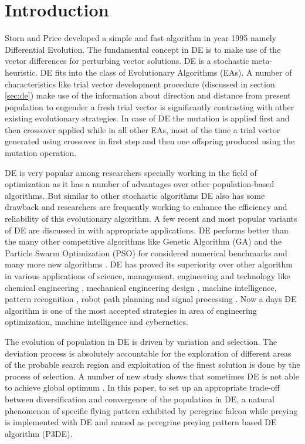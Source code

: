 \documentclass{svproc}
\begin{document}
\section{Introduction}\label{sec:intro}
Storn and Price \cite{price1996differential} developed a simple and fast algorithm in year 1995 namely Differential Evolution. The fundamental concept in DE is to make use of the vector differences for perturbing vector solutions. DE is a stochastic meta-heuristic. DE fits into the class of Evolutionary Algorithms (EAs). A number of characteristics like trial vector development procedure (discussed in section \ref{sec:de}) make use of the information about direction and distance from present population to engender a fresh trial vector is significantly contrasting with other existing evolutionary strategies. In case of DE the mutation is applied first and then  crossover applied while in all other EAs, most of the time a trial vector generated using crossover in first step and then one offspring produced using the mutation operation.

DE is very popular among researchers specially working in the field of optimization as it has a number of advantages over other population-based algorithms. But similar to other stochastic algorithms DE also has some drawback and researchers are frequently working to enhance the efficiency and reliability of this evolutionary algorithm. A few recent and most popular variants of DE are discussed  in \cite{chakraborty2008advances} with appropriate applications. DE performs better than the many other 	competitive algorithms like Genetic Algorithm (GA) \cite{holland1975adaptation, kumar2018genetic} and the Particle Swarm Optimization (PSO) \cite{kennedy1995particle} for considered numerical benchmarks \cite{vesterstrom2004comparative} and many more new algorithms \cite{rajpurohit2017glossary}. DE has proved its superiority over other algorithm in various applications of science, management, engineering and technology like chemical engineering \cite{liu2008inverse}, mechanical engineering design \cite{rogalsky2000differential},  machine intelligence, pattern recognition \cite{omran2005differential}, robot path planning \cite{sharma2019black} and signal processing \cite{das2006two}. Now a days DE algorithm is one of the most accepted strategies in area of engineering optimization, machine intelligence and cybernetics.

The evolution of population in DE is driven by variation and selection.  The deviation process is absolutely accountable for the exploration of different areas of the probable search region and exploitation of the finest solution is done by the process of selection. A number of new study shows that sometimes DE is not able to achieve global optimum \cite{lampinen2000stagnation}. In this paper, to set up an appropriate trade-off between diversification and convergence of the population in DE, a natural phenomenon of specific flying pattern exhibited by peregrine falcon while preying is implemented with DE and named as peregrine preying pattern based DE algorithm (P3DE).
\end{document}
